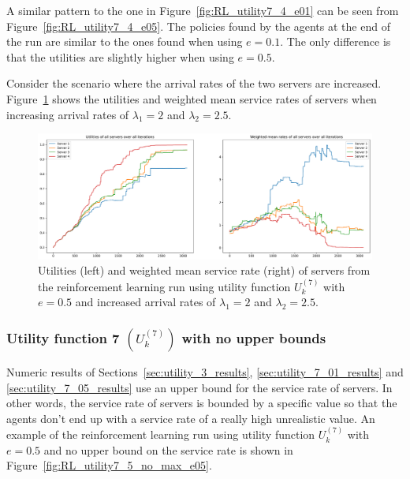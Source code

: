 A similar pattern to the one in Figure~\ref{fig:RL_utility7_4_e01} can be seen
from Figure~\ref{fig:RL_utility7_4_e05}.
The policies found by the agents at the end of the run are similar to the ones
found when using \(e = 0.1\).
The only difference is that the utilities are slightly higher when using
\(e = 0.5\).

Consider the scenario where the arrival rates of the two servers are increased.
Figure~\ref{fig:RL_utility7_4_e05_Lambda_45} shows the utilities and weighted
mean service rates of servers when increasing arrival rates of
\(\lambda_1 = 2\) and \(\lambda_2 = 2.5\).

\begin{figure}[H]
    \includegraphics[width=\textwidth]{chapters/06_agent_based_extension/Bin/reinforcement_learning_results/utility_7/u7_4_e05_Lambda_45.pdf}
    \caption{Utilities (left) and weighted mean service rate (right) of servers
    from the reinforcement learning run using utility function \(U_k^{(7)}\)
    with \(e = 0.5\) and increased arrival rates of \(\lambda_1 = 2\) and
    \(\lambda_2 = 2.5\).}
    \label{fig:RL_utility7_4_e05_Lambda_45}
\end{figure}


\subsubsection{Utility function 7 \((U_k^{(7)})\) with no upper bounds}
\label{sec:utility_7_no_upper_bound_results}

Numeric results of Sections~\ref{sec:utility_3_results},
\ref{sec:utility_7_01_results} and \ref{sec:utility_7_05_results} use an upper
bound for the service rate of servers.
In other words, the service rate of servers is bounded by a specific value
so that the agents don't end up with a service rate of a really high
unrealistic value.
An example of the reinforcement learning run using utility function
\(U_k^{(7)}\) with \(e = 0.5\) and no upper bound on the service rate is
shown in Figure~\ref{fig:RL_utility7_5_no_max_e05}.

